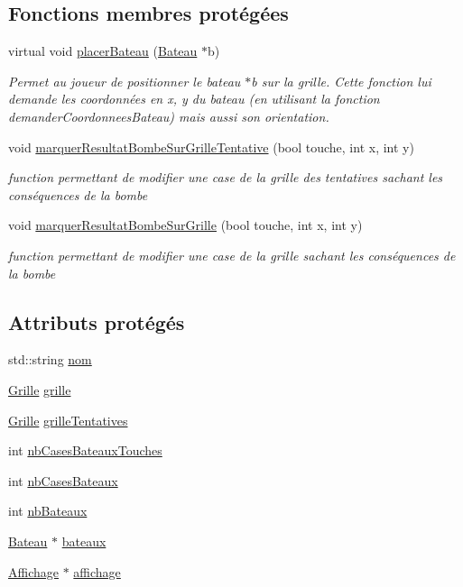 \subsection*{Fonctions membres protégées}
\begin{DoxyCompactItemize}
\item 
virtual void \hyperlink{class_joueur_a817129cc5062c058a153a241c74eee79}{placer\+Bateau} (\hyperlink{class_bateau}{Bateau} $\ast$b)
\begin{DoxyCompactList}\small\item\em Permet au joueur de positionner le bateau {\ttfamily $\ast$b} sur la grille. Cette fonction lui demande les coordonnées en x, y du bateau (en utilisant la fonction demander\+Coordonnees\+Bateau) mais aussi son orientation. \end{DoxyCompactList}\item 
void \hyperlink{class_joueur_ab42cd00f0ff47934eecde3fbaf06f2a5}{marquer\+Resultat\+Bombe\+Sur\+Grille\+Tentative} (bool touche, int x, int y)
\begin{DoxyCompactList}\small\item\em function permettant de modifier une case de la grille des tentatives sachant les conséquences de la bombe \end{DoxyCompactList}\item 
void \hyperlink{class_joueur_a3b77de3d2a5d2845bfefddb051460e80}{marquer\+Resultat\+Bombe\+Sur\+Grille} (bool touche, int x, int y)
\begin{DoxyCompactList}\small\item\em function permettant de modifier une case de la grille sachant les conséquences de la bombe \end{DoxyCompactList}\end{DoxyCompactItemize}
\subsection*{Attributs protégés}
\begin{DoxyCompactItemize}
\item 
std\+::string \hyperlink{class_joueur_abaee0b4f259181bf66dbab54bef971bb}{nom}
\item 
\hyperlink{class_grille}{Grille} \hyperlink{class_joueur_a97a052f0b9966c94c49862df3144a62f}{grille}
\item 
\hyperlink{class_grille}{Grille} \hyperlink{class_joueur_abbef5ee9c9c05a24ffa2c462e14cdfd7}{grille\+Tentatives}
\item 
int \hyperlink{class_joueur_a3a41069191547937ddd3acd15eecd4ee}{nb\+Cases\+Bateaux\+Touches}
\item 
int \hyperlink{class_joueur_a29e4485fe7b0a3f2c962757b7c7bf2a5}{nb\+Cases\+Bateaux}
\item 
int \hyperlink{class_joueur_a56752b0a96da94b17b07fd0312035a13}{nb\+Bateaux}
\item 
\hyperlink{class_bateau}{Bateau} $\ast$ \hyperlink{class_joueur_acf537ce482b493555318da7da14d8ac9}{bateaux}
\item 
\hyperlink{class_affichage}{Affichage} $\ast$ \hyperlink{class_joueur_a388634e5c242146dad447bc04756bab5}{affichage}
\end{DoxyCompactItemize}
